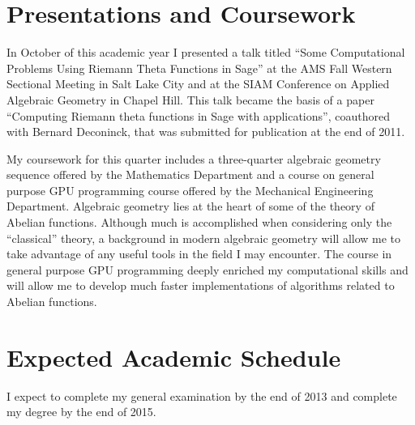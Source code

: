 \documentclass[11pt]{amsart}
\begin{document}
\section*{Presentations and Coursework}

In October of this academic year I presented a talk titled ``Some 
Computational Problems Using Riemann Theta Functions in Sage'' at the AMS Fall
Western Sectional Meeting in Salt Lake City and at the SIAM Conference on 
Applied Algebraic Geometry in Chapel Hill. This talk became the basis of a
paper ``Computing Riemann theta functions in Sage with applications'', 
coauthored with Bernard Deconinck, that was submitted for publication at the 
end of 2011.

My coursework for this quarter includes a three-quarter algebraic geometry 
sequence offered by the Mathematics Department and a course on general purpose
GPU programming course offered by the Mechanical Engineering Department.
Algebraic geometry lies at the heart of some of the theory of Abelian 
functions. Although much is accomplished when considering only the ``classical''
theory, a background in modern algebraic geometry will allow me to take 
advantage of any useful tools in the field I may encounter. The course in 
general purpose GPU programming deeply enriched my computational skills and 
will allow me to develop much faster implementations of algorithms related 
to Abelian functions.

\section*{Expected Academic Schedule}

I expect to complete my general examination by the end of 2013 and complete
my degree by the end of 2015.
\end{document}
